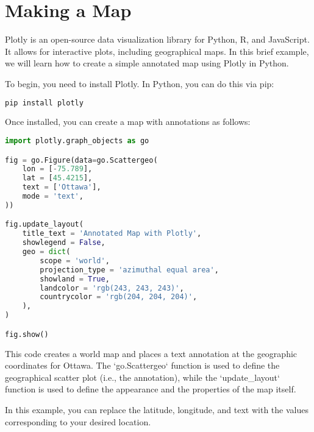 \chapter{Making a Map}


Plotly is an open-source data visualization library for Python, R, and
JavaScript. It allows for interactive plots, including geographical
maps. In this brief example, we will learn how to create a simple
annotated map using Plotly in Python.

To begin, you need to install Plotly. In Python, you can do this via pip:

\begin{lstlisting}[language=Python]
pip install plotly
\end{lstlisting}

Once installed, you can create a map with annotations as follows:

\begin{lstlisting}[language=Python]
import plotly.graph_objects as go

fig = go.Figure(data=go.Scattergeo(
    lon = [-75.789], 
    lat = [45.4215],
    text = ['Ottawa'],
    mode = 'text',
))

fig.update_layout(
    title_text = 'Annotated Map with Plotly',
    showlegend = False,
    geo = dict(
        scope = 'world',
        projection_type = 'azimuthal equal area',
        showland = True,
        landcolor = 'rgb(243, 243, 243)',
        countrycolor = 'rgb(204, 204, 204)',
    ),
)

fig.show()
\end{lstlisting}

This code creates a world map and places a text annotation at the
geographic coordinates for Ottawa. The `go.Scattergeo` function is
used to define the geographical scatter plot (i.e., the annotation),
while the `update\_layout` function is used to define the appearance
and the properties of the map itself.

In this example, you can replace the latitude, longitude, and text
with the values corresponding to your desired location.
